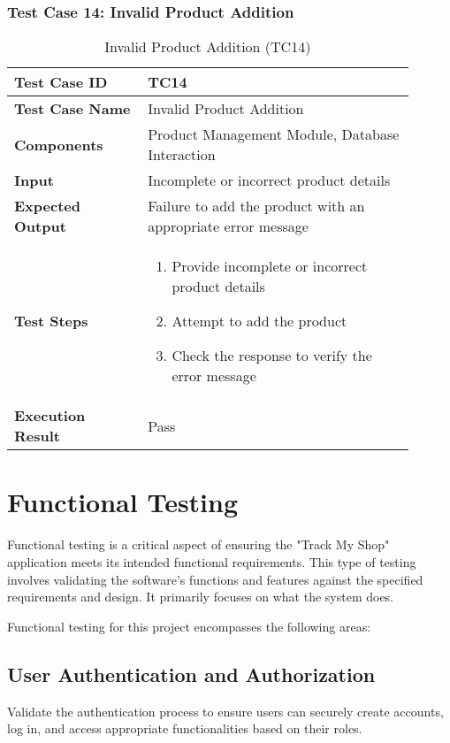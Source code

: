 \begin{table}[h]
	\subsubsection{Test Case 14: Invalid Product Addition}
	\centering
	\caption{Invalid Product Addition (TC14)}
	\begin{tabular}{|p{0.3\linewidth}|p{0.6\linewidth}|}
		\hline
		\textbf{Test Case ID} & TC14 \\
		\hline
		\textbf{Test Case Name} & Invalid Product Addition \\
		\hline
		\textbf{Components} & Product Management Module, Database Interaction \\
		\hline
		\textbf{Input} & Incomplete or incorrect product details \\
		\hline
		\textbf{Expected Output} & Failure to add the product with an appropriate error message \\
		\hline
		\textbf{Test Steps} & 
		\begin{enumerate}
			\item Provide incomplete or incorrect product details
			\item Attempt to add the product
			\item Check the response to verify the error message
		\end{enumerate} \\
		\hline
		\textbf{Execution Result} & Pass \\
		\hline
	\end{tabular}
\end{table}





\pagebreak
\section{Functional Testing}

Functional testing is a critical aspect of ensuring the "Track My Shop" application meets its intended functional requirements. This type of testing involves validating the software's functions and features against the specified requirements and design. It primarily focuses on what the system does.

Functional testing for this project encompasses the following areas:

\subsection{User Authentication and Authorization} Validate the authentication process to ensure users can securely create accounts, log in, and access appropriate functionalities based on their roles.

